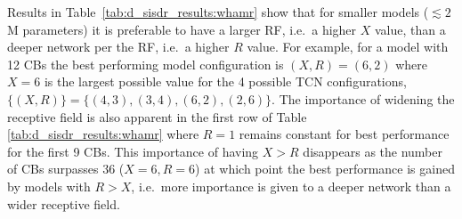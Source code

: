 \documentclass[conference,a4paper]{IEEEtran}
\begin{document}
{Results in Table~\ref{tab:d_sisdr_results:whamr}} 
show that for smaller models ($\lesssim2$M parameters)  it is preferable to have a larger \ac{RF}, i.e.{~a higher} $X$ value, than a deeper network per the \ac{RF}, i.e.{~a higher} $R$ value. For example, for a model with 12 \acp{CB} the best performing model configuration is $(X,R)=(6,2)$ where $X=6$ is the largest possible value for the 4 possible \ac{TCN} configurations, $\{(X,R)\}=\{(4,3),(3,4),(6,2),(2,6)\}$. 
The importance of widening the receptive field is also apparent in the first row of Table \ref{tab:d_sisdr_results:whamr} where $R=1$ remains constant for best performance for the first 9 \acp{CB}. This importance of having $X>R$ disappears as the number of \acp{CB} surpasses 36 ($X=6, R=6$) at which point the best performance is gained by models with $R>X$, i.e.~more importance is given to a deeper network than a wider receptive field.
\end{document}

